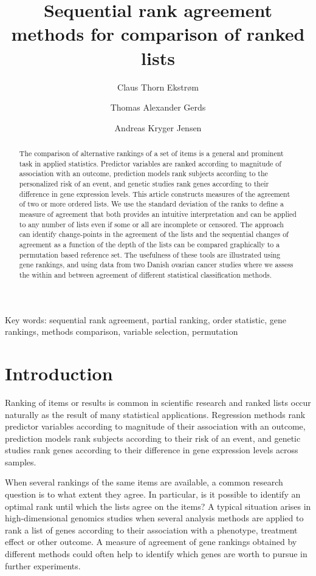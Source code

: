 \documentclass[12pt,a4paper]{article}
\title{Sequential rank agreement methods for comparison of ranked lists}
\author{Claus Thorn Ekstrøm}
\author{Thomas Alexander Gerds}
\author{Andreas Kryger Jensen}
\affil{Biostatistics, University of Copenhagen}
\theoremstyle{plain}
\begin{document}



\maketitle

\begin{abstract}
  The comparison of alternative rankings of a set of items is a
  general and prominent task in applied statistics. Predictor
  variables are ranked according to magnitude of association with an
  outcome, prediction models rank subjects according to the
  personalized risk of an event, and genetic studies rank genes
  according to their difference in gene expression levels. This
  article constructs measures of the agreement of two or more ordered
  lists. We use the standard deviation of the ranks to define a
  measure of agreement that both provides an intuitive interpretation
  and can be applied to any number of lists even if some or all are
  incomplete or censored. The approach can identify change-points in
  the agreement of the lists and the sequential changes of agreement
  as a function of the depth of the lists can be compared graphically
  to a permutation based reference set.  The usefulness of these tools
  are illustrated using gene rankings, and using data from two Danish
  ovarian cancer studies where we assess the within and between
  agreement of different statistical classification methods.
\end{abstract}

Key words: sequential rank agreement, partial ranking, order
statistic, gene rankings, methods comparison, variable selection,
permutation

\section{Introduction}

Ranking of items or results is common in scientific research and
ranked lists occur naturally as the result of many statistical
applications. Regression methods rank predictor variables according to
magnitude of their association with an outcome, prediction models rank
subjects according to their risk of an event, and genetic studies rank
genes according to their difference in gene expression levels across
samples.


When several rankings of the same items are available, a common
research question is to what extent they agree. In particular, is it
possible to identify an optimal rank until which the lists agree on
the items?  A typical situation arises in high-dimensional genomics
studies when several analysis methods are applied to rank a list of
genes according to their association with a phenotype, treatment
effect or other outcome. A measure of agreement of gene rankings
obtained by different methods could often help to identify which genes
are worth to pursue in further experiments.
\end{document}
